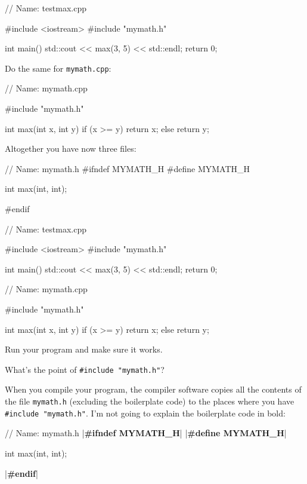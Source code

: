 \begin{consolethree}[escapeinside=||]
// Name: testmax.cpp

#include <iostream>
#include "mymath.h"

int main()
{
    std::cout << max(3, 5) << std::endl;
    return 0;
}
\end{consolethree}

Do the same for \texttt{mymath.cpp}:

\begin{consolethree}[escapeinside=||]
// Name: mymath.cpp

#include "mymath.h"

int max(int x, int y)
{
    if (x >= y)
        return x;
    else
        return y;
}
\end{consolethree}

Altogether you have now three files:

\begin{consolethree}[escapeinside=||]
// Name: mymath.h
#ifndef MYMATH_H
#define MYMATH_H

int max(int, int);

#endif
\end{consolethree}

\begin{consolethree}[escapeinside=||]
// Name: testmax.cpp

#include <iostream>
#include "mymath.h"

int main()
{
    std::cout << max(3, 5) << std::endl;
    return 0;
}
\end{consolethree}

\begin{consolethree}[escapeinside=||]
// Name: mymath.cpp

#include "mymath.h"

int max(int x, int y)
{
    if (x >= y)
        return x;
    else
        return y;
}
\end{consolethree}

Run your program and make sure it works.

What's the point of \texttt{\#include "mymath.h"}?

When you compile your program, the compiler software copies all the
contents of the file \texttt{mymath.h} (excluding the boilerplate code) to
the places where you have \texttt{\#include "mymath.h"}.
I'm not going to explain the boilerplate code in bold:

\begin{consolethree}[escapeinside=||]
// Name: mymath.h
|\textbf{\#ifndef MYMATH\_H}|
|\textbf{\#define MYMATH\_H}|

int max(int, int);

|\textbf{\#endif}|
\end{consolethree}

